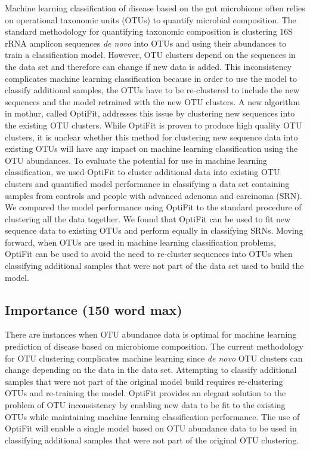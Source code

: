 \documentclass[
]{article}
\begin{document}
Machine learning classification of disease based on the gut microbiome
often relies on operational taxonomic units (OTUs) to quantify microbial
composition. The standard methodology for quantifying taxonomic
composition is clustering 16S rRNA amplicon sequences \emph{de novo}
into OTUs and using their abundances to train a classification model.
However, OTU clusters depend on the sequences in the data set and
therefore can change if new data is added. This inconsistency
complicates machine learning classification because in order to use the
model to classify additional samples, the OTUs have to be re-clustered
to include the new sequences and the model retrained with the new OTU
clusters. A new algorithm in mothur, called OptiFit, addresses this
issue by clustering new sequences into the existing OTU clusters. While
OptiFit is proven to produce high quality OTU clusters, it is unclear
whether this method for clustering new sequence data into existing OTUs
will have any impact on machine learning classification using the OTU
abundances. To evaluate the potential for use in machine learning
classification, we used OptiFit to cluster additional data into existing
OTU clusters and quantified model performance in classifying a data set
containing samples from controls and people with advanced adenoma and
carcinoma (SRN). We compared the model performance using OptiFit to the
standard procedure of clustering all the data together. We found that
OptiFit can be used to fit new sequence data to existing OTUs and
perform equally in classifying SRNs. Moving forward, when OTUs are used
in machine learning classification problems, OptiFit can be used to
avoid the need to re-cluster sequences into OTUs when classifying
additional samples that were not part of the data set used to build the
model.

\hypertarget{importance-150-word-max}{%
\subsection{Importance (150 word max)}\label{importance-150-word-max}}

There are instances when OTU abundance data is optimal for machine
learning prediction of disease based on microbiome composition. The
current methodology for OTU clustering complicates machine learning
since \emph{de novo} OTU clusters can change depending on the data in
the data set. Attempting to classify additional samples that were not
part of the original model build requires re-clustering OTUs and
re-training the model. OptiFit provides an elegant solution to the
problem of OTU inconsistency by enabling new data to be fit to the
existing OTUs while maintaining machine learning classification
performance. The use of OptiFit will enable a single model based on OTU
abundance data to be used in classifying additional samples that were
not part of the original OTU clustering.
\end{document}
